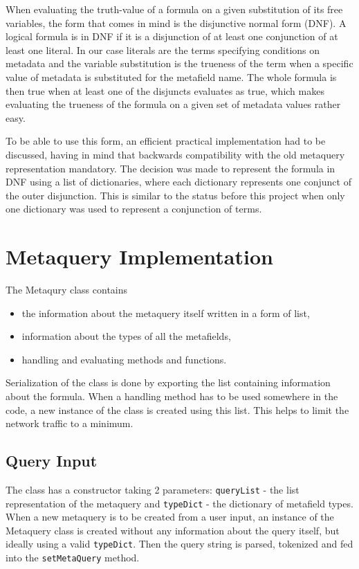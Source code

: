 When evaluating the truth-value of a formula on a given substitution of its free variables, the 
form that comes in mind is the disjunctive normal form (DNF). A logical formula is in DNF if
it is a disjunction of at least one conjunction of at least one literal. In our case literals 
are the terms specifying conditions on metadata and the variable substitution is the trueness
of the term when a specific value of metadata is substituted for the metafield name. The whole
formula is then true when at least one of the disjuncts evaluates as true, which makes evaluating
the trueness of the formula on a given set of metadata values rather easy.

To be able to use this form, an efficient practical implementation had to be discussed, having in 
mind that backwards compatibility with the old metaquery representation mandatory. The decision 
was made to represent the formula in DNF using a list of dictionaries, where each dictionary 
represents one conjunct of the outer disjunction. This is similar to the status before this project
when only one dictionary was used to represent a conjunction of terms. 

\section{Metaquery Implementation}

The Metaqury class contains 
\begin{itemize}
\item the information about the metaquery itself written in a form of list,
\item information about the types of all the metafields,
\item handling and evaluating methods and functions.
\end{itemize}
Serialization of the class is done by exporting the list containing information about the formula. 
When a handling method has to be used somewhere in the code, a new instance of the class is created 
using this list. This helps to limit the network traffic to a minimum. 

\subsection{Query Input}

The class has a constructor taking 2 parameters: \texttt{queryList} - the list representation of the 
metaquery and \texttt{typeDict} - the dictionary of metafield types. When a new metaquery is to be 
created from a user input, an instance of the Metaquery class is created without any information
about the query itself, but ideally using a valid \texttt{typeDict}. Then the query string is parsed, 
tokenized and fed into the \texttt{setMetaQuery} method.


